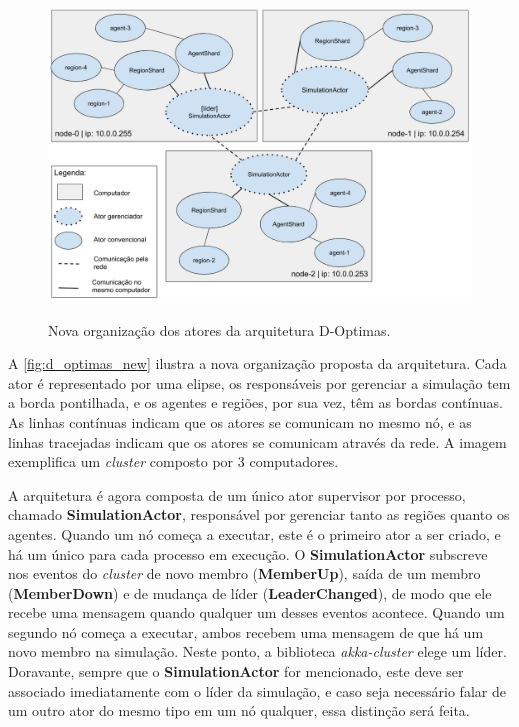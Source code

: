  \begin{figure}
     \centering
     \caption{Nova organização dos atores da arquitetura D-Optimas.}
     \includegraphics[scale=0.45]{imagens/d-optimas-new.png}
     \label{fig:d_optimas_new}
 \end{figure}
 
 A \autoref{fig:d_optimas_new} ilustra a nova organização proposta da arquitetura. Cada ator é representado por uma elipse, os responsáveis por gerenciar a simulação tem a borda pontilhada, e os agentes e regiões, por sua vez, têm as bordas contínuas. As linhas contínuas indicam que os atores se comunicam no mesmo nó, e as linhas tracejadas indicam que os atores se comunicam através da rede. A imagem exemplifica um \textit{cluster} composto por 3 computadores. 
 
 A arquitetura é agora composta de um único ator supervisor por processo, chamado \textbf{SimulationActor}, responsável por gerenciar tanto as regiões quanto os agentes. Quando um nó começa a executar, este é o primeiro ator a ser criado, e há um único para cada processo em execução. O \textbf{SimulationActor} subscreve nos eventos do \textit{cluster} de novo membro (\textbf{MemberUp}), saída de um membro (\textbf{MemberDown}) e de mudança de líder (\textbf{LeaderChanged}), de modo que ele recebe uma mensagem quando qualquer um desses eventos acontece. Quando um segundo nó começa a executar, ambos recebem uma mensagem de que há um novo membro na simulação. Neste ponto, a biblioteca \textit{akka-cluster} elege um líder. Doravante, sempre que o \textbf{SimulationActor} for mencionado, este deve ser associado imediatamente com o líder da simulação, e caso seja necessário falar de um outro ator do mesmo tipo em um nó qualquer, essa distinção será feita. 
  
